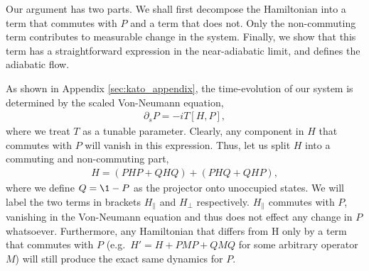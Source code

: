 Our argument has two parts. We shall first decompose the Hamiltonian into a term that commutes with $P$ and a term that does not. Only the non-commuting term contributes to measurable change in the system. Finally, we show that this term has a straightforward expression in the near-adiabatic limit, and defines the adiabatic flow. 

As shown in Appendix \ref{sec:kato_appendix}, the time-evolution of our system is determined by the scaled Von-Neumann equation,
\begin{align}\label{eqn:von_neumann_ap}
    \partial_{s} P = -i T[H,P],
\end{align}
where we treat $T$ as a tunable parameter. Clearly, any component in $H$ that commutes with $P$ will vanish in this expression. Thus, let us split $H$ into a commuting and non-commuting part,
\begin{align}
    H = (PHP + QHQ) + (PHQ + QHP),
\end{align}
where we define $Q = \1 - P$ as the projector onto unoccupied states. We will label the two terms in brackets $H_{\parallel}$ and $H_{\perp}$ respectively. $H_{\parallel}$ commutes with $P$, vanishing in the Von-Neumann equation and thus does not effect any change in $P$ whatsoever. Furthermore, any Hamiltonian that differs from H only by a term that commutes with $P$ (e.g.~$H' = H + PMP + QMQ$ for some arbitrary operator $M$) will still produce the exact same dynamics for $P$.

